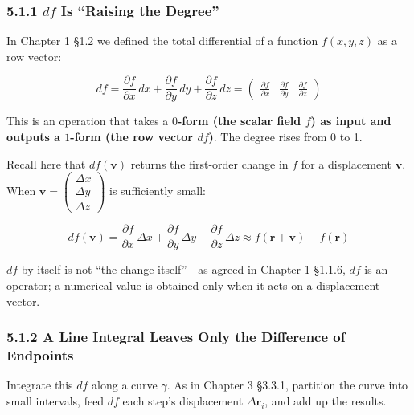 \documentclass[a4paper,12pt,openany]{book}
\begin{document}
\hypertarget{df-is-raising-the-degree}{%
\subsubsection{\texorpdfstring{5.1.1 \(df\) Is ``Raising the
Degree''}{5.1.1 df Is ``Raising the Degree''}}\label{df-is-raising-the-degree}}

In Chapter 1 §1.2 we defined the total differential of a function
\(f(x,y,z)\) as a row vector:

\[df = \frac{\partial f}{\partial x}\,dx + \frac{\partial f}{\partial y}\,dy + \frac{\partial f}{\partial z}\,dz = \begin{pmatrix} \frac{\partial f}{\partial x} & \frac{\partial f}{\partial y} & \frac{\partial f}{\partial z} \end{pmatrix}\]

This is an operation that takes a
\textbf{$0$-form (the scalar field $f$) as input and outputs a $1$-form (the row vector $df$)}.
The degree rises from 0 to 1.

Recall here that \(df(\mathbf{v})\) returns the first-order change in
\(f\) for a displacement \(\mathbf{v}\). When
\(\mathbf{v} = \begin{pmatrix}\Delta x\\\Delta y\\\Delta z\end{pmatrix}\)
is sufficiently small:

\[df(\mathbf{v}) = \frac{\partial f}{\partial x}\,\Delta x + \frac{\partial f}{\partial y}\,\Delta y + \frac{\partial f}{\partial z}\,\Delta z \approx f(\mathbf{r}+\mathbf{v}) - f(\mathbf{r})\]

\(df\) by itself is not ``the change itself''—as agreed in Chapter 1
§1.1.6, \(df\) is an operator; a numerical value is obtained only when
it acts on a displacement vector.

\hypertarget{a-line-integral-leaves-only-the-difference-of-endpoints}{%
\subsubsection{5.1.2 A Line Integral Leaves Only the Difference of
Endpoints}\label{a-line-integral-leaves-only-the-difference-of-endpoints}}

Integrate this \(df\) along a curve \(\gamma\). As in Chapter 3 §3.3.1,
partition the curve into small intervals, feed \(df\) each step's
displacement \(\Delta\mathbf{r}_i\), and add up the results.
\end{document}
